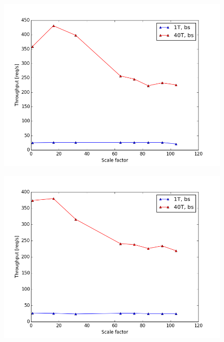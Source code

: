 \begin{figure}[h]
	\begin{minipage}{.5\textwidth}
		\centering
		\includegraphics[scale=0.42]{figures/results/vm115_large_wbs.png}
		\label{fig:vm115_large_wbs}
	\end{minipage}
	\begin{minipage}{.5\textwidth}
		\centering
		\includegraphics[scale=0.42]{figures/results/vm116_large_wbs.png}
		\label{fig:vm116_large_wbs}
	\end{minipage}
\end{figure}

